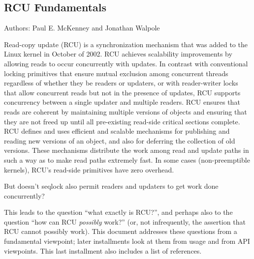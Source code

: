 
\subsection{RCU Fundamentals}
\label{sec:defer:RCU Fundamentals}

Authors: Paul E. McKenney and Jonathan Walpole

Read-copy update (RCU) is a synchronization mechanism that was added to
the Linux kernel in October of 2002.
RCU achieves scalability
improvements by allowing reads to occur concurrently with updates.
In contrast with conventional locking primitives that ensure mutual exclusion
among concurrent threads regardless of whether they be readers or
updaters, or with reader-writer locks that allow concurrent reads but not in
the presence of updates, RCU supports concurrency between a single
updater and multiple readers.
RCU ensures that reads are coherent by
maintaining multiple versions of objects and ensuring that they are not
freed up until all pre-existing read-side critical sections complete.
RCU defines and uses efficient and scalable mechanisms for publishing
and reading new versions of an object, and also for deferring the collection
of old versions.
These mechanisms distribute the work among read and
update paths in such a way as to make read paths extremely fast. In some
cases (non-preemptible kernels), RCU's read-side primitives have zero
overhead.

\QuickQuiz{}
	But doesn't seqlock also permit readers and updaters to get
	work done concurrently?
 \QuickQuizEnd

This leads to the question ``what exactly is RCU?'', and perhaps also
to the question ``how can RCU \emph{possibly} work?'' (or, not
infrequently, the assertion that RCU cannot possibly work).
This document addresses these questions from a fundamental viewpoint;
later installments look at them from usage and from API viewpoints.
This last installment also includes a list of references.

